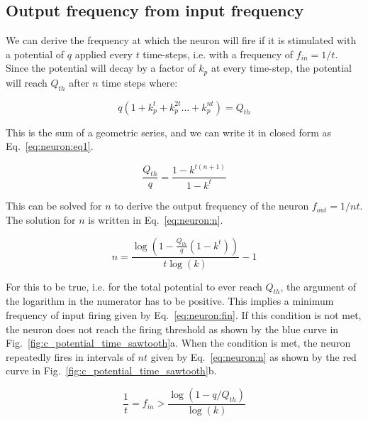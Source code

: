 \subsection{Output frequency from input frequency}

We can derive the frequency at which the neuron will fire if it is stimulated with a potential of $q$ applied every $t$ time-steps, i.e. with a frequency of $f_{in} = 1/t$. Since the potential will decay by a factor of $k_p$ at every time-step, the potential will reach $Q_{th}$ after $n$ time steps where:

\begin{equation*}
q(1 + k_p^t + k_p^{2t} ... + k_p^{nt}) = Q_{th}
\end{equation*}  

This is the sum of a geometric series, and we can write it in closed form as Eq.~\ref{eq:neuron:eq1}.

\begin{equation}
\label{eq:neuron:eq1}
\frac{Q_{th}}{q} = \frac{1-k^{t(n+1)}}{1-k^t}
\end{equation}

This can be solved for $n$ to derive the output frequency of the neuron $f_{out} = 1/nt$. The solution for $n$ is written in Eq.~\ref{eq:neuron:n}.

\begin{equation}
\label{eq:neuron:n}
n = \frac{\log(1-\frac{Q_{th}}{q}(1-k^t))}{t\log(k)}-1
\end{equation}

For this to be true, i.e. for the total potential to ever reach $Q_{th}$, the argument of the logarithm in the numerator has to be positive. This implies a minimum frequency of input firing given by Eq.~\ref{eq:neuron:fin}. If this condition is not met, the neuron does not reach the firing threshold as shown by the blue curve in Fig.~\ref{fig:c_potential_time_sawtooth}a. When the condition is met, the neuron repeatedly fires in intervals of $nt$ given by Eq.~\ref{eq:neuron:n} as shown by the red curve in Fig.~\ref{fig:c_potential_time_sawtooth}b.

\begin{equation}
\label{eq:neuron:fin}
\frac{1}{t} = f_{in} > \frac{\log(1-q/Q_{th})}{\log(k)}
\end{equation}

